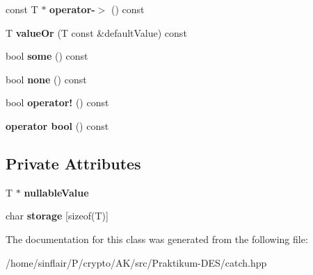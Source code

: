 \begin{DoxyCompactItemize}
\mbox{\label{classCatch_1_1Option_ae8343cbc36dbb95b2dce333d2a6fdc28}} 
const T $\ast$ {\bfseries operator-\/$>$} () const
\item 
\mbox{\label{classCatch_1_1Option_a8d9ae2e30b0eb76fe134a6fbc8423124}} 
T {\bfseries value\+Or} (T const \&default\+Value) const
\item 
\mbox{\label{classCatch_1_1Option_a97c95829afbe92f2bcc5fd75b32c0825}} 
bool {\bfseries some} () const
\item 
\mbox{\label{classCatch_1_1Option_a821753afdc3fac947a13a01fbe0d248e}} 
bool {\bfseries none} () const
\item 
\mbox{\label{classCatch_1_1Option_a96dccb86bdf45ee0c08e122b6133bef3}} 
bool {\bfseries operator!} () const
\item 
\mbox{\label{classCatch_1_1Option_aba0def0bd9cd45d4e00fe47a604b0270}} 
{\bfseries operator bool} () const
\end{DoxyCompactItemize}
\subsection*{Private Attributes}
\begin{DoxyCompactItemize}
\item 
\mbox{\label{classCatch_1_1Option_aa6643e8dc409f4fc86cc8c80f9c3266b}} 
T $\ast$ {\bfseries nullable\+Value}
\item 
\mbox{\label{classCatch_1_1Option_acdebca1b18bb8542c3f676b8dd805f23}} 
char {\bfseries storage} \mbox{[}sizeof(T)\mbox{]}
\end{DoxyCompactItemize}


The documentation for this class was generated from the following file\+:\begin{DoxyCompactItemize}
\item 
/home/sinflair/\+P/crypto/\+A\+K/src/\+Praktikum-\/\+D\+E\+S/catch.\+hpp\end{DoxyCompactItemize}

